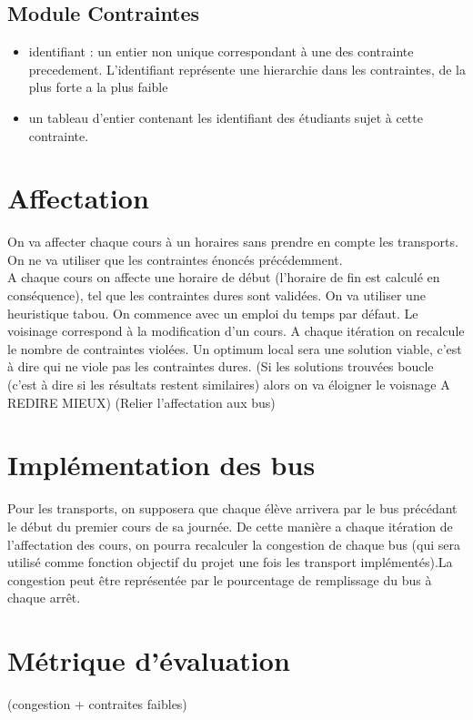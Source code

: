 \documentclass[a4paper,11pt]{article}
\begin{document}
	\subsection{Module Contraintes}  
		\begin{itemize}
			\item identifiant : un entier non unique correspondant à une des contrainte precedement. L'identifiant représente une hierarchie dans les contraintes, de la plus forte a la plus faible 
			\item un tableau d'entier contenant les identifiant des étudiants sujet à cette contrainte.
		\end{itemize}
\section{Affectation}
	On va affecter chaque cours à un horaires sans prendre en compte les transports. On ne va utiliser que les contraintes énoncés précédemment. \\
	A chaque cours on affecte une horaire de début (l'horaire de fin est calculé en conséquence), tel que les contraintes dures sont validées.
	On va utiliser une heuristique tabou. On commence avec un emploi du temps par défaut. Le voisinage correspond à la modification d'un cours. A chaque itération on recalcule le nombre de contraintes violées. Un optimum local sera une solution viable, c'est à dire qui ne viole pas les contraintes dures.
	(Si les solutions trouvées boucle (c'est à dire si les résultats restent similaires) alors on va éloigner le voisnage A REDIRE MIEUX)
	(Relier l'affectation aux bus)
	
\section{Implémentation des bus}
	Pour les transports, on supposera que chaque élève arrivera par le bus précédant le début du premier cours de sa journée. De cette manière a chaque itération de l'affectation des cours, on pourra recalculer la congestion de chaque bus (qui sera utilisé comme fonction objectif du projet une fois les transport implémentés).La congestion peut être représentée par le pourcentage de remplissage du bus à chaque arrêt. 

\section{Métrique d'évaluation}
	(congestion + contraites faibles)
\end{document}
